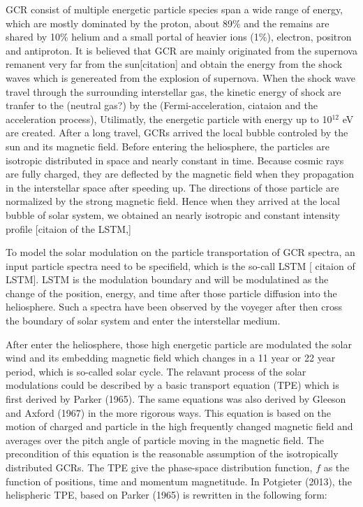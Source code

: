 \acs{GCR} consist of multiple energetic particle species span a wide range of energy, which are mostly dominated by the proton, about 89\%  and the remains are shared by 10\% helium and a small portal of heavier ions (1\%), electron, positron and antiproton. 
It is believed that \acs{GCR} are mainly originated from the supernova remanent very far from the sun[citation] and obtain the energy from the shock waves which is genereated from the explosion of supernova. When the shock wave travel through the surrounding interstellar gas, the kinetic energy of shock are tranfer to the  (neutral gas?) by the (Fermi-acceleration, ciataion and the acceleration process), Utilimatly, the energetic particle with energy up to 10$^12$ eV are created.
After a long travel, \acp{GCR} arrived the local bubble controled by the sun and its magnetic field. Before entering the heliosphere,  the particles are isotropic distributed in space and nearly constant  in time. Because cosmic rays are fully charged, they are deflected by the magnetic field when they propagation in the interstellar space after speeding up. The directions of those particle are normalized by the strong magnetic field. Hence when they arrived at the local bubble of solar system, we obtained an nearly isotropic and constant intensity profile [citaion of the LSTM,]

To model the solar modulation on the particle transportation of GCR spectra, an input particle spectra need to be specifield, which is the so-call LSTM [ citaion of LSTM]. LSTM is the modulation boundary and will be modulatined as the change of the position, energy, and time after those particle diffusion into the heliosphere. Such a spectra have been observed by the voyeger after then cross the boundary of solar system and enter the interstellar medium.


After enter the heliosphere, those high energetic particle are modulated the solar wind and its embedding magnetic field  which changes in a 11 year or 22 year period, which is so-called solar cycle.
The relavant process of the solar modulations could be described by a basic transport equation (TPE) which is first derived by Parker (1965). The same equations was also derived by Gleeson and Axford (1967) in the more rigorous ways. This equation is based on the motion of charged and particle in the high frequently changed magnetic field and averages over the pitch angle of particle moving in the magnetic field. The precondition of this equation is the reasonable assumption of the isotropically distributed GCRs. The TPE give the phase-space distribution function, $f$ as the function of positions, time and momentum magnetitude. In Potgieter (2013), the helispheric TPE, based on Parker (1965) is rewritten in the following form:

